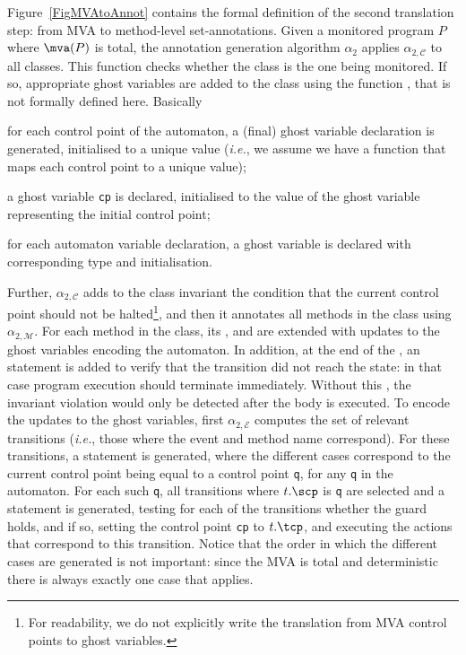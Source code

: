 Figure~\ref{FigMVAtoAnnot} contains the formal definition of the
second translation step: from MVA to method-level set-annotations.
Given a monitored program \(P\) where \(\mva(P)\) is total,
the annotation generation algorithm \(\alpha_2\) applies
\(\alpha_{2, \mathcal{C}}\) to all classes.
This function checks whether the class is the one being
monitored. If so, appropriate ghost variables are added to the class
using the function \newgvs, that is not formally defined here. Basically
\begin{inparaenum}
\item for each control point of the automaton, a (final) ghost
variable declaration is generated, initialised to a unique value
(\emph{i.e.}, we assume we have a function \unique that maps each
control point to a unique value);
\item a ghost variable \texttt{cp} is declared, initialised to the
value of the ghost variable representing the initial control point;
\item for each automaton variable declaration, a ghost variable is
declared with corresponding type and initialisation.
\end{inparaenum}
Further, \(\alpha_{2, \mathcal{C}}\) adds to the class invariant
the condition that the current control point should not be
halted\footnote{For readability, we do not explicitly write the
translation from MVA control points to ghost variables.}, and then it
annotates all methods in the class using \(\alpha_{2,
\mathcal{M}}\). For each method in the class, its \preset, \postset
and \excset are extended with updates to the ghost variables encoding
the automaton. In addition, at the end of the \preset, an \Assert
statement is added to verify that the transition did not reach the
\halted state: in that case program execution should terminate
immediately.  Without this \Assert, the invariant violation would only
be detected after the body is executed. To encode the updates to the
ghost variables, first \(\alpha_{2, \mathcal{E}}\) computes the set of
relevant transitions (\emph{i.e.}, those where the event and method
name correspond). For these transitions, a \CaseJML statement is
generated, where the different cases correspond to the current control
point being equal to a control point \texttt{q}, for any
\texttt{q} in the automaton. For each such \texttt{q}, all transitions
where \(t.\scp\) is \texttt{q} are selected and a \CaseJML
statement is generated, testing for each of the transitions whether
the guard holds, and if so, setting the control point \texttt{cp} to
\(t.\tcp\), and executing the actions that correspond to this
transition.
Notice that the order in which the different cases are generated is
not important: since the MVA is total and deterministic there is
always exactly one case that applies.

